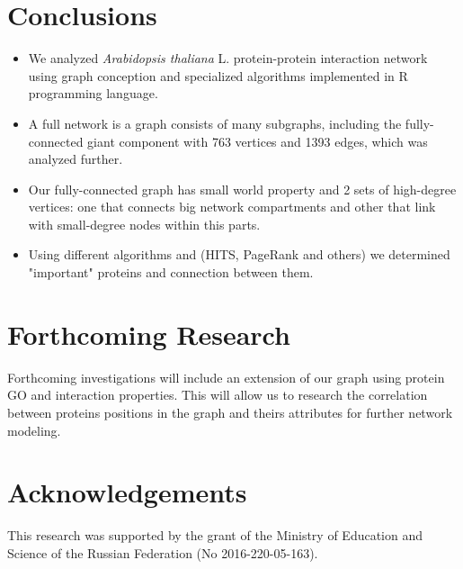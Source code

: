 \documentclass[a0,portrait]{a0poster}
\begin{document}
\begin{multicols}{2}

\color{SaddleBrown} %

\section*{Conclusions}

\begin{itemize}
\item We analyzed \textit{Arabidopsis thaliana} L. protein-protein interaction network using graph conception and specialized algorithms implemented in R programming language.
\item A full network is a graph consists of many subgraphs, including the fully-connected giant component with 763 vertices and 1393 edges, which was analyzed further. 
\item Our fully-connected graph has small world property and 2 sets of high-degree vertices: one that connects big network compartments and other that link with small-degree nodes within this parts.
\item Using different algorithms and (HITS, PageRank and others) we determined "important" proteins and connection between them.
\end{itemize}

\color{DarkSlateGray} %


\section*{Forthcoming Research}
Forthcoming investigations will include an extension of our graph using protein GO and interaction properties. This will allow us to research the correlation between proteins positions in the graph and theirs attributes for further network modeling. 


\section*{Acknowledgements}

This research was supported by the grant of the Ministry of Education and Science of the Russian Federation (No 2016-220-05-163).


\end{multicols}
\end{document}
